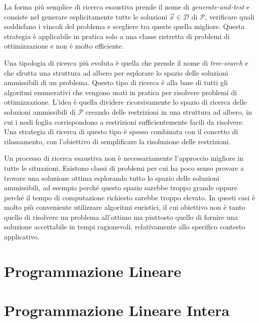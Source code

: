La forma più semplice di ricerca esaustiva prende il nome di
\textit{generate-and-test} e consiste nel generare esplicitamente tutte le
soluzioni $\vec{x} \in \mathcal{D}$ di $\mathcal{P}$, verificare quali
soddisfano i vincoli del problema e scegliere tra queste quella migliore.
Questa strategia è applicabile in pratica solo a una classe ristretta di
problemi di ottimizzazione e non è molto efficiente.

Una tipologia di ricerca più evoluta è quella che prende il nome di
\textit{tree-search} e che sfrutta una struttura ad albero per esplorare lo
spazio delle soluzioni ammissibili di un problema. Questo tipo di ricerca è
alla base di tutti gli algoritmi enumerativi che vengono usati in pratica
per risolvere problemi di ottimizzazione. L'idea è quella dividere
ricorsivamente lo spazio di ricerca delle soluzioni ammissibili di
$\mathcal{P}$ creando delle restrizioni in una struttura ad albero, in cui
i nodi foglia corrispondono a restrizioni sufficientemente facili da
risolvere. Una strategia di ricerca di questo tipo è spesso combinata con
il concetto di rilassamento, con l'obiettivo di semplificare la risoluzione
delle restrizioni.

Un processo di ricerca esaustiva non è necessariamente l'approccio migliore
in tutte le situazioni. Esistono classi di problemi per cui ha poco senso
provare a trovare una soluzione ottima esplorando tutto lo spazio delle
soluzioni ammissibili, ad esempio perché questo spazio sarebbe troppo
grande oppure perché il tempo di computazione richiesto sarebbe troppo
elevato.  In questi casi è molto più conveniente utilizzare algoritmi
euristici, il cui obiettivo non è tanto quello di risolvere un  problema
all'ottimo ma piuttosto quello di fornire una soluzione accettabile in
tempi ragionevoli, relativamente allo specifico contesto applicativo.



\section{Programmazione Lineare}
\section{Programmazione Lineare Intera}

